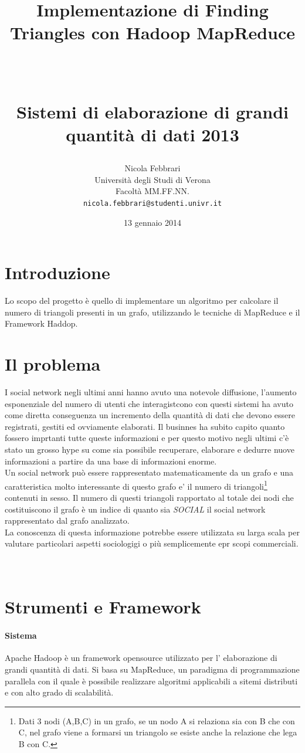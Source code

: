 \documentclass[paper=a4, fontsize=11pt]{scrartcl}	%
\title{ \vspace{-1in} 	\usefont{OT1}{bch}{b}{n}
		\huge \strut Implementazione di Finding Triangles con Hadoop MapReduce\strut \\
		\Large \bfseries \strut Sistemi di elaborazione di grandi quantità di dati 2013 \strut
}
\author{ 									\usefont{OT1}{bch}{m}{n}
        Nicola Febbrari\\		\usefont{OT1}{bch}{m}{n}
        Università degli Studi di Verona\\	\usefont{OT1}{bch}{m}{n}
        Facoltà MM.FF.NN.\\
        \texttt{nicola.febbrari@studenti.univr.it}
}
\date{13 gennaio 2014}
\numberwithin{equation}{section}															%
\numberwithin{figure}{section}																%
\numberwithin{table}{section}																%
\begin{document}
\maketitle
\section{Introduzione}
Lo scopo del progetto è quello di implementare un algoritmo per calcolare il numero di triangoli presenti in un grafo, utilizzando le tecniche di MapReduce e il Framework Haddop.


\section{Il problema}
I social network negli ultimi anni hanno avuto una notevole diffusione, l'aumento esponenziale del numero di utenti che interagistcono con questi sistemi 
ha avuto come diretta conseguenza un  incremento della quantità di dati che devono essere registrati, gestiti ed ovviamente elaborati.
Il businnes ha subito capito quanto fossero imprtanti tutte queste informazioni e per questo motivo negli ultimi c'è stato un grosso hype su come sia 
possibile recuperare, elaborare e dedurre nuove informazioni a partire da una base di informazioni enorme.\\
Un social network può essere rappresentato matematicamente da un grafo e una caratteristica molto interessante di questo grafo e' il numero di 
triangoli\footnote{Dati 3 nodi (A,B,C) in un grafo, se un nodo A si relaziona sia con B che con C, nel grafo viene a formarsi un triangolo se esiste anche la relazione che lega B con C.} 
contenuti in sesso. 
Il numero di questi triangoli rapportato al totale dei nodi che costituiscono il grafo è un indice di quanto sia \emph{SOCIAL} il social network rappresentato dal grafo analizzato.\\
La conoscenza di questa informazione potrebbe essere utilizzata su larga scala per valutare particolari aspetti sociologigi o più semplicemente epr scopi commerciali.\\
\\
\\
\section{Strumenti e Framework}
\paragraph{Sistema}
Apache Hadoop è un framework opensource utilizzato per l' elaborazione di grandi quantità di dati. 
Si basa su MapReduce, un paradigma di programmazione parallela con il quale è possibile realizzare algoritmi applicabili a sitemi distributi e con alto grado di scalabilità.
\end{document}

